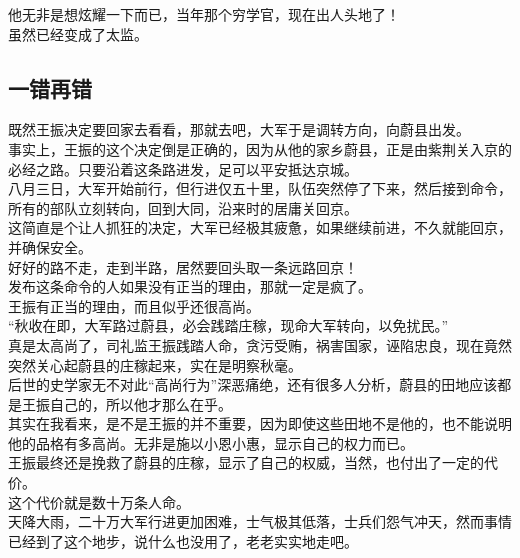 \begin{multicols}{\theparacolNo}
他无非是想炫耀一下而已，当年那个穷学官，现在出人头地了！\\

虽然已经变成了太监。\\

\subsection{一错再错}
既然王振决定要回家去看看，那就去吧，大军于是调转方向，向蔚县出发。\\

事实上，王振的这个决定倒是正确的，因为从他的家乡蔚县，正是由紫荆关入京的必经之路。只要沿着这条路进发，足可以平安抵达京城。\\

八月三日，大军开始前行，但行进仅五十里，队伍突然停了下来，然后接到命令，所有的部队立刻转向，回到大同，沿来时的居庸关回京。\\

这简直是个让人抓狂的决定，大军已经极其疲惫，如果继续前进，不久就能回京，并确保安全。\\

好好的路不走，走到半路，居然要回头取一条远路回京！\\

发布这条命令的人如果没有正当的理由，那就一定是疯了。\\

王振有正当的理由，而且似乎还很高尚。\\

“秋收在即，大军路过蔚县，必会践踏庄稼，现命大军转向，以免扰民。”\\

真是太高尚了，司礼监王振践踏人命，贪污受贿，祸害国家，诬陷忠良，现在竟然突然关心起蔚县的庄稼起来，实在是明察秋毫。\\

后世的史学家无不对此“高尚行为”深恶痛绝，还有很多人分析，蔚县的田地应该都是王振自己的，所以他才那么在乎。\\

其实在我看来，是不是王振的并不重要，因为即使这些田地不是他的，也不能说明他的品格有多高尚。无非是施以小恩小惠，显示自己的权力而已。\\

王振最终还是挽救了蔚县的庄稼，显示了自己的权威，当然，也付出了一定的代价。\\

这个代价就是数十万条人命。\\

天降大雨，二十万大军行进更加困难，士气极其低落，士兵们怨气冲天，然而事情已经到了这个地步，说什么也没用了，老老实实地走吧。\\


\end{multicols}
